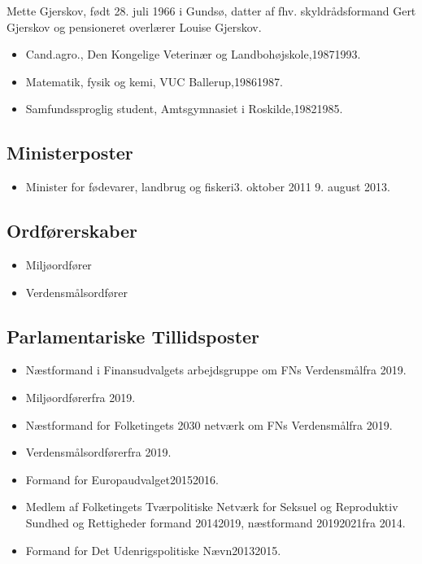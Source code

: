 \documentclass[11pt, a4paper]{awesome-cv}
\begin{document}
\makecvheader[R]
\makelettertitle
\begin{cvletter}
Mette Gjerskov, født 28. juli 1966 i Gundsø, datter af fhv. skyldrådsformand Gert Gjerskov og pensioneret overlærer Louise Gjerskov.

\begin{itemize}
\item Cand.agro., Den Kongelige Veterinær og Landbohøjskole,19871993.
\item Matematik, fysik og kemi, VUC Ballerup,19861987.
\item Samfundssproglig student, Amtsgymnasiet i Roskilde,19821985.
\end{itemize}
\subsection*{Ministerposter}
\begin{itemize}
\item Minister for fødevarer, landbrug og fiskeri3. oktober 2011  9. august 2013.
\end{itemize}
\subsection*{Ordførerskaber}
\begin{itemize}
\item Miljøordfører
\item Verdensmålsordfører
\end{itemize}
\subsection*{Parlamentariske Tillidsposter}
\begin{itemize}
\item Næstformand i Finansudvalgets arbejdsgruppe om FNs Verdensmålfra 2019.
\item Miljøordførerfra 2019.
\item Næstformand for Folketingets 2030 netværk om FNs Verdensmålfra 2019.
\item Verdensmålsordførerfra 2019.
\item Formand for Europaudvalget20152016.
\item Medlem af Folketingets Tværpolitiske Netværk for Seksuel og Reproduktiv Sundhed og Rettigheder formand 20142019, næstformand 20192021fra 2014.
\item Formand for Det Udenrigspolitiske Nævn20132015.
\end{itemize}

\end{cvletter}
\end{document}
